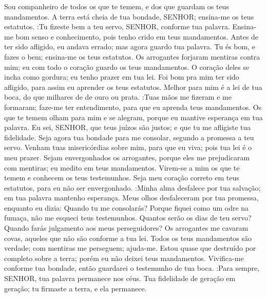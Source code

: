 {  Sou companheiro de todos os que te temem, e dos que guardam os teus mandamentos.
  A terra está cheia de tua bondade, SENHOR; ensina-me os teus estatutos.
   :Tu fizeste bem a teu servo, SENHOR, conforme tua palavra.
  Ensina-me bom senso e conhecimento, pois tenho crido em teus mandamentos.
  Antes de ter sido afligido, eu andava errado; mas agora guardo tua palavra.
  Tu és bom, e fazes o bem; ensina-me os teus estatutos.
  Os arrogantes forjaram mentiras contra mim;
{} eu com todo o
{} coração guardo os teus mandamentos.
  O coração deles se incha como gordura;
{} eu tenho prazer em tua lei.
  Foi bom pra mim ter sido afligido, para assim eu aprender os teus estatutos.
  Melhor para mim é a lei de tua boca, do que milhares de
{} de ouro ou prata.
   :Tuas mãos me fizeram e me formaram; faze-me ter entendimento, para que eu aprenda teus mandamentos.
  Os que te temem olham para mim e se alegram, porque eu mantive esperança em tua palavra.
  Eu sei, SENHOR, que teus juízos são justos; e que tu me afligiste
{} tua fidelidade.
  Seja agora tua bondade para me consolar, segundo a promessa
{} a teu servo.
  Venham tuas misericórdias sobre mim, para que eu viva; pois tua lei é o meu prazer.
  Sejam envergonhados os arrogantes, porque eles me prejudicaram com mentiras;
{} eu medito em teus mandamentos.
  Virem-se a mim os que te temem e conhecem os teus testemunhos.
  Seja meu coração correto em teus estatutos, para eu não ser envergonhado.
   :Minha alma desfalece por tua salvação; em tua palavra mantenho esperança.
  Meus olhos desfaleceram por tua promessa, enquanto eu dizia: Quando tu me consolarás?
  Porque fiquei como um odre na fumaça,
{} não me esqueci teus testemunhos.
  Quantos serão os dias de teu servo? Quando farás julgamento aos meus perseguidores?
  Os arrogantes me cavaram covas, aqueles que não são conforme a tua lei.
  Todos os teus mandamentos são verdade; com mentiras me perseguem; ajuda-me.
  Estou quase que destruído por completo sobre a terra; porém eu não deixei teus mandamentos.
  Vivifica-me conforme tua bondade, então guardarei o testemunho de tua boca.
   :Para sempre, SENHOR, tua palavra permanece nos céus.
  Tua fidelidade
{} de geração em geração; tu firmaste a terra, e
{} ela permanece.
}

